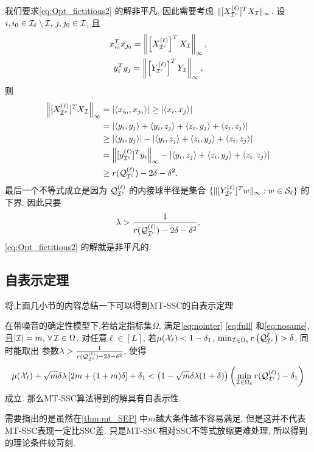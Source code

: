 我们要求\eqref{eq:Opt_fictitious2} 的解非平凡, 因此需要考虑
\(\|[X_{\mathcal{I}^c}^{(\ell)}]^T X_{\mathcal{I}} \|_{\infty} \).
设\(i, i_0\in \mathcal{I}_\ell \setminus \mathcal{I}, \, j, j_0\in
\mathcal{I}\), 且
\begin{gather*}
x_{i_0}^T x_{j_0}=\left\|\left[X_{\mathcal{I}^c}^{(\ell)}\right]^T X_{\mathcal{I}}\right\|_\infty, \\
y_i^T y_j=\left\|\left[ Y_{\mathcal{I}^c}^{(\ell)}\right]^T Y_{\mathcal{I}}\right\|_\infty ,
\end{gather*}
则
\begin{align}
  \left\|[X_{\mathcal{I}^c}^{(\ell)}]^TX_{\mathcal{I}}\right\|_{\infty}&=\left|\langle x_{i_0},
  x_{j_0}\rangle\right|  \geq \left|\langle x_i, x_j\rangle\right|\nonumber\\
  &= \left|\langle y_i, y_j\rangle  + \langle y_i, z_j\rangle + \langle z_i, y_j\rangle + \langle z_i, z_j\rangle\right|\nonumber\\
  &\geq \left|\langle y_i, y_j\rangle\right| - \left|\langle y_i, z_j\rangle + \langle z_i, y_j\rangle + \langle z_i, z_j\rangle\right|\nonumber\\
  & = \left\|[y_{\mathcal{I}^c}^{(\ell)}]^Ty_i\right\|_{\infty} - \left|\langle y_i, z_j\rangle + \langle z_i, y_j\rangle + \langle z_i, z_j\rangle\right|\nonumber\\
  &\geq r(\mathcal{Q}^{(\ell)}_{\mathcal{I}^c}) - 2\delta - \delta^2. \label{eq:lowerbounding_maX_affinity}
\end{align}
最后一个不等式成立是因为 \(\mathcal{Q}^{(\ell)}_{\mathcal{I}^c}\) 
的内接球半径是集合 \(\{\| [ Y_{\mathcal{I}^c}^{(\ell)}]^T w\|_\infty: w
\in  \mathcal{S}_{\ell}\} \) 的下界. 因此只要
\begin{equation}\label{eq:lambda_low}
  \lambda > \frac{1}{ r(\mathcal{Q}^{(\ell)}_{\mathcal{I}^c}) - 2\delta - \delta^2},
\end{equation}
\eqref{eq:Opt_fictitious2} 的解就是非平凡的.

\subsection{自表示定理}
将上面几小节的内容总结一下可以得到MT-SSC的自表示定理
\begin{theorem}\label{thm:mt_SEP}
  在带噪音的确定性模型下,若给定指标集\(\Omega\), 满足\eqref{eq:nointer} 
\eqref{eq:full} 和\eqref{eq:nosame},  且\(|\mathcal{I}|=m, \, \forall\, \mathcal{I} \in \Omega\).
  对任意\(\ell \in [L]\), 若\(\mu(\mathcal{X}_\ell)<1-\delta_1\), \(\min_{\mathcal{I}\in
  \Omega_\ell} r\left(\mathcal{Q}^\ell_{\mathcal{I}^c}\right) > \delta\), 同时能取出
  参数\(\lambda > \frac{1}{ r(\mathcal{Q}^{(\ell)}_{\mathcal{I}^c}) - 2\delta -\delta^2}\),
  使得
  \[\mu(\mathcal{X}_\ell) +\sqrt{m}\delta\lambda \left[2m+(1+m)\delta \right] +\delta_1
  < \left(1-\sqrt{m}\delta\lambda(1+\delta)\right)\left(\min_{\mathcal{I}\in \Omega_\ell}
  r(\mathcal{Q}^{(\ell)}_{\mathcal{I}^c})-\delta_1\right)\]
  成立. 那么MT-SSC算法得到的解具有自表示性.
\end{theorem}
需要指出的是虽然在\autoref{thm:mt_SEP} 中\(m\)越大条件越不容易满足,
但是这并不代表MT-SSC表现一定比SSC差. 只是MT-SSC相对SSC不等式放缩更难处理,
所以得到的理论条件较苛刻.

